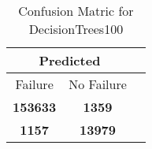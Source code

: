 \begin{table}[] 
\caption{Confusion Matric for DecisionTrees100} 
\label{Table: Prediction Accuracy-DMDDecisionTrees100100.0EKF-ignoreReflection-Reflection} 
\centering 
\begin{tabular} 
 {@{}ccc@{}} 
\toprule 
\multicolumn{2}{c}{\textbf{Predicted}}
 \\ \midrule 
\multicolumn{1}{|c|}{Failure} & 
\multicolumn{1}{c|}{No Failure}
 \\ \midrule 
\multicolumn{1}{|c|}{\color{green}\textbf{153633}} & 
\multicolumn{1}{c|}{\color{red}\textbf{1359}}
 \\ \midrule 
\multicolumn{1}{|c|}{\color{red}\textbf{1157}} & 
\multicolumn{1}{c|}{\color{green}\textbf{13979}}
 \\ \bottomrule 
\end{tabular} 
\end{table} 
